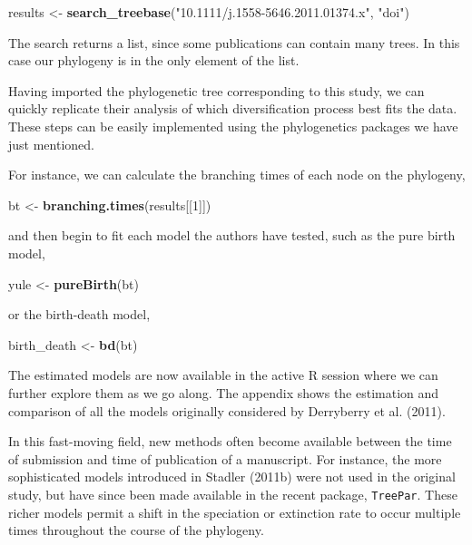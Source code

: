 \documentclass[author-year, 8pt, 3p]{elsarticle} %
\newenvironment{Shaded}{}{}
\newcommand{\KeywordTok}[1]{\textcolor[rgb]{0.00,0.44,0.13}{\textbf{{#1}}}}
\newcommand{\DecValTok}[1]{\textcolor[rgb]{0.25,0.63,0.44}{{#1}}}
\newcommand{\StringTok}[1]{\textcolor[rgb]{0.25,0.44,0.63}{{#1}}}
\newcommand{\NormalTok}[1]{{#1}}
\begin{document}
\begin{Shaded}
\begin{Highlighting}[]
\NormalTok{results <- }\KeywordTok{search_treebase}\NormalTok{(}\StringTok{"10.1111/j.1558-5646.2011.01374.x"}\NormalTok{, }\StringTok{"doi"}\NormalTok{) }
\end{Highlighting}
\end{Shaded}
The search returns a list, since some publications can contain many
trees. In this case our phylogeny is in the only element of the list.

Having imported the phylogenetic tree corresponding to this study, we
can quickly replicate their analysis of which diversification process
best fits the data. These steps can be easily implemented using the
phylogenetics packages we have just mentioned.

For instance, we can calculate the branching times of each node on the
phylogeny,

\begin{Shaded}
\begin{Highlighting}[]
\NormalTok{bt <- }\KeywordTok{branching.times}\NormalTok{(results[[}\DecValTok{1}\NormalTok{]])}
\end{Highlighting}
\end{Shaded}
and then begin to fit each model the authors have tested, such as the
pure birth model,

\begin{Shaded}
\begin{Highlighting}[]
\NormalTok{yule <- }\KeywordTok{pureBirth}\NormalTok{(bt)}
\end{Highlighting}
\end{Shaded}
or the birth-death model,

\begin{Shaded}
\begin{Highlighting}[]
\NormalTok{birth_death <- }\KeywordTok{bd}\NormalTok{(bt)}
\end{Highlighting}
\end{Shaded}
The estimated models are now available in the active R session where we
can further explore them as we go along. The appendix shows the
estimation and comparison of all the models originally considered by
Derryberry et al. (2011).

In this fast-moving field, new methods often become available between
the time of submission and time of publication of a manuscript. For
instance, the more sophisticated models introduced in Stadler (2011b)
were not used in the original study, but have since been made available
in the recent package, \texttt{TreePar}. These richer models permit a
shift in the speciation or extinction rate to occur multiple times
throughout the course of the phylogeny.
\end{document}
